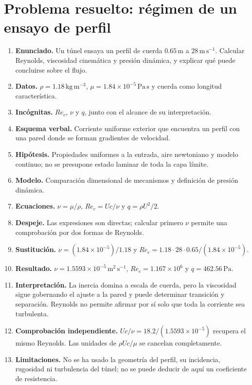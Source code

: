 \section{Problema resuelto: régimen de un ensayo de perfil}
\begin{enumerate}
\item \textbf{Enunciado.} Un túnel ensaya un perfil de cuerda $0.65\,\mathrm{m}$ a $28\,\mathrm{m\,s^{-1}}$. Calcular Reynolds, viscosidad cinemática y presión dinámica, y explicar qué puede concluirse sobre el flujo.
\item \textbf{Datos.} $\rho=1.18\,\mathrm{kg\,m^{-3}}$, $\mu=1.84\times10^{-5}\,\mathrm{Pa\,s}$ y cuerda como longitud característica.
\item \textbf{Incógnitas.} $Re_c$, $\nu$ y $q$, junto con el alcance de su interpretación.
\item \textbf{Esquema verbal.} Corriente uniforme exterior que encuentra un perfil con una pared donde se forman gradientes de velocidad.
\item \textbf{Hipótesis.} Propiedades uniformes a la entrada, aire newtoniano y modelo continuo; no se presupone estado laminar de toda la capa límite.
\item \textbf{Modelo.} Comparación dimensional de mecanismos y definición de presión dinámica.
\item \textbf{Ecuaciones.} $\nu=\mu/\rho$, $Re_c=Uc/\nu$ y $q=\rho U^2/2$.
\item \textbf{Despeje.} Las expresiones son directas; calcular primero $\nu$ permite una comprobación por dos formas de Reynolds.
\item \textbf{Sustitución.} $\nu=(1.84\times10^{-5})/1.18$ y $Re_c=1.18\cdot28\cdot0.65/(1.84\times10^{-5})$.
\item \textbf{Resultado.} $\nu=1.5593\times10^{-5}\,\mathrm{m^2\,s^{-1}}$, $Re_c=1.167\times10^6$ y $q=462.56\,\mathrm{Pa}$.
\item \textbf{Interpretación.} La inercia domina a escala de cuerda, pero la viscosidad sigue gobernando el ajuste a la pared y puede determinar transición y separación. Reynolds no permite afirmar por sí solo que toda la corriente sea turbulenta.
\item \textbf{Comprobación independiente.} $Uc/\nu=18.2/(1.5593\times10^{-5})$ recupera el mismo Reynolds. Las unidades de $\rho Uc/\mu$ se cancelan completamente.
\item \textbf{Limitaciones.} No se ha usado la geometría del perfil, su incidencia, rugosidad ni turbulencia del túnel; no se puede deducir de aquí un coeficiente de resistencia.
\end{enumerate}

